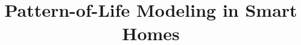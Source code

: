 \documentclass[journal]{./IEEEtran/IEEEtran}
\begin{document}

\title{Pattern-of-Life Modeling in Smart Homes}



\author{}



\def\ps@IEEEtitlepagestyle{%
\def\@oddfoot{\mycopyrightnotice}%
\def\@evenfoot{}%
}

\def\mycopyrightnotice{\hfill \begin{minipage}{13cm}\footnotesize \centering
2327-4662 \copyright \ 2018 IEEE. Personal use is permitted, but republication/redistribution requires IEEE permission. See http://www.ieee.org/publications\_standards/publications/rights/index.html for more information.\end{minipage}\hfill
\gdef\mycopyrightnotice{}%
}

\maketitle
\end{document}
